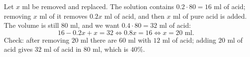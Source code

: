 Let $x$ ml be removed and replaced. The solution contains $0.2\cdot80=16$ ml of acid; removing $x$ ml of it removes $0.2x$ ml of acid, and then $x$ ml of pure acid is added. The volume is still $80$ ml, and we want $0.4\cdot80=32$ ml of acid:
\[
16-0.2x+x=32\iff0.8x=16\iff x=\boxed{20}\text{ ml}.
\]
Check: after removing $20$ ml there are $60$ ml with $12$ ml of acid; adding $20$ ml of acid gives $32$ ml of acid in $80$ ml, which is $40\%$.
